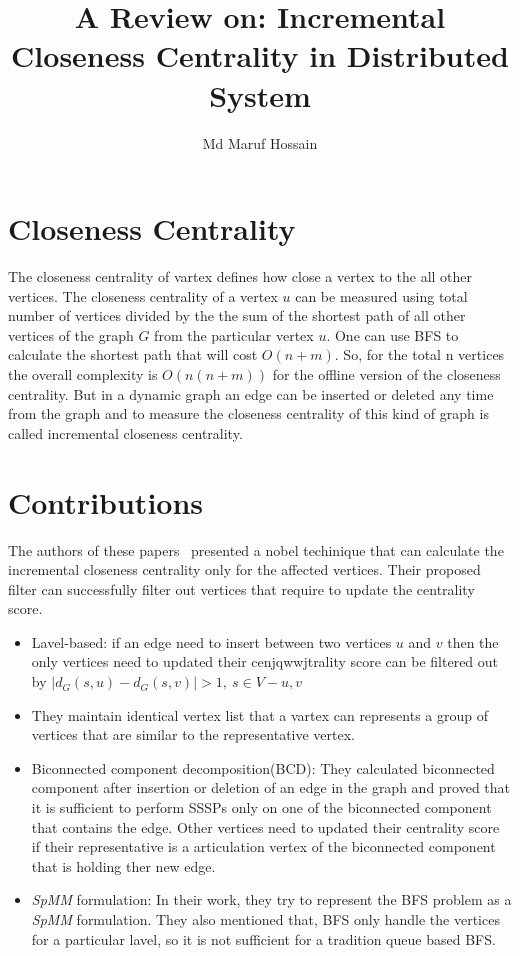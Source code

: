 \documentclass[conference, onecolumn]{IEEEtran}
\begin{document}
\title{A Review on: Incremental Closeness Centrality in Distributed System}


\author{Md Maruf Hossain}

\maketitle

\section{Closeness Centrality}
The closeness centrality of vartex defines how close 
a vertex to the all other vertices. The closeness centrality of a vertex $u$
can be measured using total number of vertices divided by the the sum of the 
shortest path of all other vertices of the graph $G$ from the particular vertex 
$u$. One can use BFS to calculate the shortest path that will cost $O(n+m)$. 
So, for the total n vertices the overall complexity is $O(n(n+m))$ for the 
offline version of the closeness centrality. But in a dynamic graph an edge can 
be inserted or deleted any time from the graph and to measure the closeness 
centrality of this kind of graph is called incremental closeness centrality.

\section{Contributions}
The authors of these papers~\cite{sariyuce2013streamer, sariyuce2013incremental, sariyuce2015incremental} presented a nobel techinique that can calculate 
the incremental closeness centrality only for the affected vertices. 
Their proposed filter can successfully filter out vertices that require to 
update the centrality score.
\begin{itemize}
\item Lavel-based: if an edge need to insert between two vertices $u$ and $v$ then 
the only vertices need to updated their cenjqwwjtrality score can be filtered out by
$|d_G(s,u) - d_G(s,v)|>1,\ s\in V-{u,v}$
\item They maintain identical vertex list that a vartex can represents a group of vertices 
that are similar to the representative vertex.
\item Biconnected component decomposition(BCD): They calculated biconnected component after insertion 
or deletion of an edge in the graph and proved that it is sufficient to perform SSSPs only on one 
of the biconnected component that contains the edge. Other vertices need to updated their centrality 
score if their representative is a articulation vertex of the biconnected component that is holding 
ther new edge. 
\item \textit{SpMM} formulation: In their work, they try to represent the BFS problem as a 
\textit{SpMM} formulation. They also mentioned that, BFS only handle the vertices for a particular 
lavel, so it is not sufficient for a tradition queue based BFS. 
\end{itemize}



\end{document}
